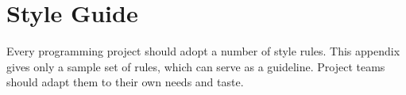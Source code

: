 %
%
%
%
%

\chapter{Style Guide}
\label{styleguide}

Every {\eclipse} programming project should adopt a number of style rules.
This appendix gives only a sample set of rules, which can serve as a guideline.
Project teams should adapt them to their own needs and taste.

